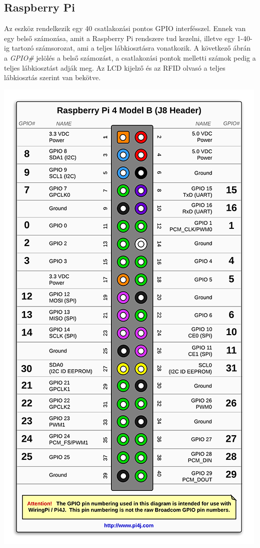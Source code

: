 \documentclass[11pt, a4paper]{article}
\begin{document}
		\subsection{Raspberry Pi}
		\begin{flushleft}
			\justifying
			Az eszköz rendelkezik egy 40 csatlakozási pontos GPIO interfésszel. Ennek van egy belső számozása, amit a Raspberry Pi rendszere tud kezelni, illetve egy 1-40-ig tartozó számsorozat, ami a teljes lábkiosztásra vonatkozik. A következő ábrán a \emph{GPIO\#} jelölés a belső számozást, a csatlakozási pontok melletti számok pedig a teljes lábkiosztást adják meg. Az LCD kijelző és az RFID olvasó a teljes lábkiosztás szerint van bekötve.
		\end{flushleft}
			\begin{minipage}{\linewidth}
				\centering
				\includegraphics[width=0.6\linewidth]{img/rpi_pinout}
				\label{fig:2rpipinout}
			\end{minipage}
			
\end{document}
